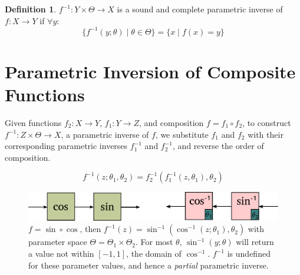 \documentclass{sciposter}
\theoremstyle{definition} %
\newtheorem{definition}{Definition}
\begin{document}
\begin{multicols}{3}
\begin{definition}$f^{-1} : Y \times \Theta \to X$ is a sound and complete parametric inverse of $f: X \to Y$ if $\forall y$:
\begin{equation}\label{pinv}
\{ f^{-1}(y; \theta) \mid \theta \in \Theta \} = \{x \mid f(x) = y \}
\end{equation}
\end{definition}



\section{Parametric Inversion of Composite Functions}\label{parametric-inversion-of-composite-functions}

Given functions $f_2: X \to Y$, $f_1: Y \to Z$, and composition $f=f_1 \circ f_2$, to construct  $f^{-1}:Z \times \Theta \to X$, a parametric inverse of $f$, we substitute $f_1$ and $f_2$ with their corresponding parametric inverses $f^{-1}_1$ and $f^{-1}_2$, and reverse the order of composition.

\begin{equation}\label{eq:compoverload}
f^{-1}(z;\theta_1, \theta_2) = f^{-1}_2(f^{-1}_1(z,\theta_1), \theta_2)
\end{equation}

\begin{figure}[!htb]
\centering
\includegraphics[width=\linewidth]{cossininvcossin.pdf}
\caption{$f = \sin \circ \cos$, then $f^{-1}(z) = \sin^{-1}(\cos^{-1}(z;\theta_1), \theta_2)$ with parameter space $\Theta = \Theta_1 \times \Theta_2$.
For most $\theta$, $\sin^{-1}(y;\theta)$ will return a value not within $[-1,1]$, the domain of $\cos^{-1}$.
$f^{-1}$ is undefined for these parameter values, and hence a \emph{partial} parametric inverse.}\label{fig:cossin}
\end{figure}


\end{multicols}
\end{document}
